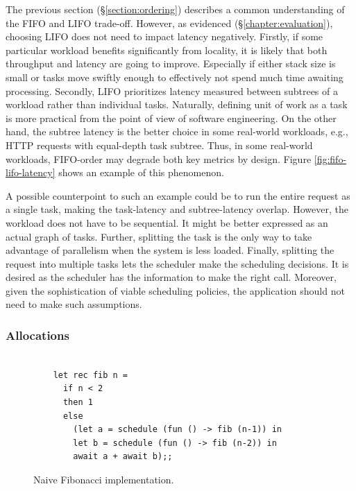 \documentclass[12pt,a4paper,twoside]{report}
\begin{document}
The previous section (\S\ref{section:ordering}) describes a common understanding of the FIFO and LIFO trade-off. However, as evidenced (\S\ref{chapter:evaluation}), choosing LIFO does not need to impact latency negatively. Firstly, if some particular workload benefits significantly from locality, it is likely that both throughput and latency are going to improve. Especially if either stack size is small or tasks move swiftly enough to effectively not spend much time awaiting processing. Secondly, LIFO prioritizes latency measured between subtrees of a workload rather than individual tasks. Naturally, defining unit of work as a task is more practical from the point of view of software engineering. On the other hand, the subtree latency is the better choice in some real-world workloads, e.g., HTTP requests with equal-depth task subtree. Thus, in some real-world workloads, FIFO-order may degrade both key metrics by design. Figure \ref{fig:fifo-lifo-latency} shows an example of this phenomenon. 

A possible counterpoint to such an example could be to run the entire request as a single task, making the task-latency and subtree-latency overlap. However, the workload does not have to be sequential. It might be better expressed as an actual graph of tasks. Further, splitting the task is the only way to take advantage of parallelism when the system is less loaded. Finally, splitting the request into multiple tasks lets the scheduler make the scheduling decisions. It is desired as the scheduler has the information to make the right call. Moreover, given the sophistication of viable scheduling policies, the application should not need to make such assumptions. 


\subsubsection{Allocations}

\begin{figure} 
    \centering
    \begin{verbatim}

    let rec fib n = 
      if n < 2 
      then 1 
      else
        (let a = schedule (fun () -> fib (n-1)) in
        let b = schedule (fun () -> fib (n-2)) in 
        await a + await b);;

    \end{verbatim}
    \caption{Naive Fibonacci implementation.}
    \label{fig:fib-pure}
\end{figure}
\end{document}
